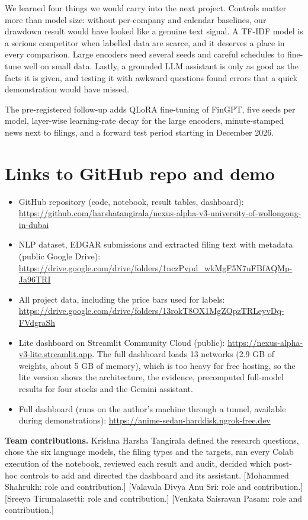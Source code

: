 \documentclass[11pt,a4paper]{article}
\begin{document}
We learned four things we would carry into the next project. Controls matter more than model size: without per-company and calendar baselines, our drawdown result would have looked like a genuine text signal. A TF-IDF model is a serious competitor when labelled data are scarce, and it deserves a place in every comparison. Large encoders need several seeds and careful schedules to fine-tune well on small data. Lastly, a grounded LLM assistant is only as good as the facts it is given, and testing it with awkward questions found errors that a quick demonstration would have missed.

The pre-registered follow-up adds QLoRA fine-tuning of FinGPT, five seeds per model, layer-wise learning-rate decay for the large encoders, minute-stamped news next to filings, and a forward test period starting in December 2026.

\section{Links to GitHub repo and demo}

\begin{itemize}
\item GitHub repository (code, notebook, result tables, dashboard): \url{https://github.com/harshatangirala/nexus-alpha-v3-university-of-wollongong-in-dubai}
\item NLP dataset, EDGAR submissions and extracted filing text with metadata (public Google Drive): \url{https://drive.google.com/drive/folders/1nczPvpd_wkMgF5N7uFBfAQMp-Ja96TRI}
\item All project data, including the price bars used for labels: \url{https://drive.google.com/drive/folders/13rokT8OX1MgZQpzTRLeyvDq-FVdgraSh}
\item Lite dashboard on Streamlit Community Cloud (public): \url{https://nexus-alpha-v3-lite.streamlit.app}. The full dashboard loads 13 networks (2.9 GB of weights, about 5 GB of memory), which is too heavy for free hosting, so the lite version shows the architecture, the evidence, precomputed full-model results for four stocks and the Gemini assistant.
\item Full dashboard (runs on the author's machine through a tunnel, available during demonstrations): \url{https://anime-sedan-harddisk.ngrok-free.dev}
\end{itemize}

\textbf{Team contributions.} Krishna Harsha Tangirala defined the research questions, chose the six language models, the filing types and the targets, ran every Colab execution of the notebook, reviewed each result and audit, decided which post-hoc controls to add and directed the dashboard and its assistant. [Mohammed Shahrukh: role and contribution.] [Valavala Divya Anu Sri: role and contribution.] [Sreeya Tirumalasetti: role and contribution.] [Venkata Saisravan Pasam: role and contribution.]
\end{document}
